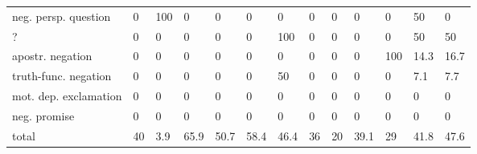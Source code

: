 \begin{screenonly}
\begin{table*}[h]
\begin{tabular*}{\hsize}{@{\extracolsep{\fill}}lllllllllllll}
    neg. persp. question & 0 & 100 & 0 & 0 & 0 & 0 & 0 & 0 & 0 & 0 & 50 & 0\\
    ? & 0 & 0 & 0 & 0 & 0 & 100 & 0 & 0 & 0 & 0 & 50 & 50\\
    apostr. negation & 0 & 0 & 0 & 0 & 0 & 0 & 0 & 0 & 0 & 100 & 14.3 & 16.7\\
    truth-func. negation & 0 & 0 & 0 & 0 & 0 & 50 & 0 & 0 & 0 & 0 & 7.1 & 7.7\\
    mot. dep. exclamation & 0 & 0 & 0 & 0 & 0 & 0 & 0 & 0 & 0 & 0 & 0 & 0\\
    neg. promise & 0 & 0 & 0 & 0 & 0 & 0 & 0 & 0 & 0 & 0 & 0 & 0\\
    \midrule
    total & 40 & 3.9 & 65.9 & 50.7 & 58.4 & 46.4 & 36 & 20 & 39.1 & 29 & 41.8 & 47.6\\
    \bottomrule
  \end{tabular*}
\end{table*}


\end{screenonly}
